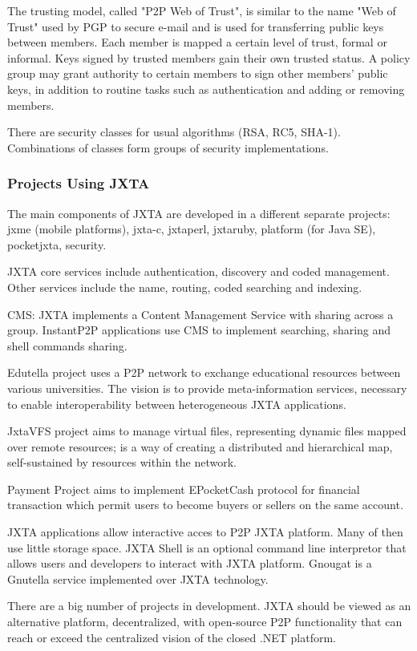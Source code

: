 The trusting model, called "P2P Web of Trust", is similar to the name "Web of
Trust" used by PGP to secure e-mail and is used for transferring public keys
between members. Each member is mapped a certain level of trust, formal or
informal. Keys signed by trusted members gain their own trusted status. A
policy group may grant authority to certain members to sign other members'
public keys, in addition to routine tasks such as authentication and adding or
removing members.

There are security classes for usual algorithms (RSA, RC5, SHA-1). Combinations
of classes form groups of security implementations.

\subsubsection{Projects Using JXTA}

The main components of JXTA are developed in a different separate projects:
jxme (mobile platforms), jxta-c, jxtaperl, jxtaruby, platform (for Java SE),
pocketjxta, security.

JXTA core services include authentication, discovery and coded management.
Other services include the name, routing, coded searching and indexing.

CMS: JXTA implements a Content Management Service with sharing across a group.
InstantP2P applications use CMS to implement searching, sharing and shell
commands sharing.

Edutella project uses a P2P network to exchange educational resources between
various universities. The vision is to provide meta-information services,
necessary to enable interoperability between heterogeneous JXTA applications.

JxtaVFS project aims to manage virtual files, representing dynamic files mapped
over remote resources; is a way of creating a distributed and hierarchical map,
self-sustained by resources within the network.

Payment Project aims to implement EPocketCash protocol for financial
transaction which permit users to become buyers or sellers on the same account.

JXTA applications allow interactive acces to P2P JXTA platform. Many of then
use little storage space. JXTA Shell is an optional command line interpretor
that allows users and developers to interact with JXTA platform. Gnougat is a
Gnutella service implemented over JXTA technology.

There are a big number of projects in development. JXTA should be viewed as an
alternative platform, decentralized, with open-source P2P functionality that
can reach or exceed the centralized vision of the closed .NET platform.

